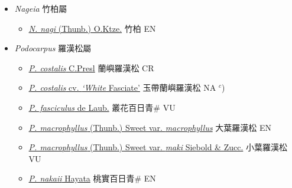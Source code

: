 
  \begin{itemize}
 \item[] \textit{Nageia} 竹柏屬
                    
  \begin{itemize}
        \item[] \href{http://www.theplantlist.org/tpl1.1/search?q=Nageia+nagi}{\textit{N. nagi} (Thunb.) O.Ktze.}   竹柏 EN
  \end{itemize}
 \item[] \textit{Podocarpus} 羅漢松屬
                    
  \begin{itemize}
        \item[] \href{http://www.theplantlist.org/tpl1.1/search?q=Podocarpus+costalis}{\textit{P. costalis} C.Presl}   蘭嶼羅漢松 CR
        \item[] \href{http://www.theplantlist.org/tpl1.1/search?q=Podocarpus+costalis+cv.+‘White}{\textit{P. costalis}  cv. \textit{‘White} Fasciate’}   玉帶蘭嶼羅漢松 NA $^c$)
        \item[] \href{http://www.theplantlist.org/tpl1.1/search?q=Podocarpus+fasciculus}{\textit{P. fasciculus} de Laub.}   叢花百日青\# VU
        \item[] \href{http://www.theplantlist.org/tpl1.1/search?q=Podocarpus+macrophyllus+var.+macrophyllus}{\textit{P. macrophyllus} (Thunb.) Sweet var. \textit{macrophyllus}}   大葉羅漢松 EN
        \item[] \href{http://www.theplantlist.org/tpl1.1/search?q=Podocarpus+macrophyllus+var.+maki}{\textit{P. macrophyllus} (Thunb.) Sweet var. \textit{maki} Siebold \& Zucc.}   小葉羅漢松 VU
        \item[] \href{http://www.theplantlist.org/tpl1.1/search?q=Podocarpus+nakaii}{\textit{P. nakaii} Hayata}   桃實百日青\# EN
  \end{itemize}
  \end{itemize}
